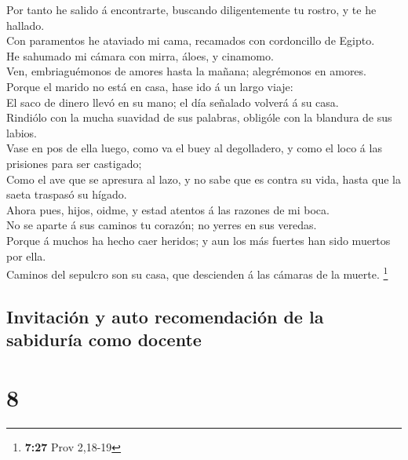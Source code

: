  Por tanto he salido á encontrarte, buscando diligentemente
tu rostro, y te he hallado.\\
 Con paramentos he ataviado mi cama, recamados con
cordoncillo de Egipto.\\
 He sahumado mi cámara con mirra, áloes, y cinamomo.\\
 Ven, embriaguémonos de amores hasta la mañana; alegrémonos
en amores.\\
 Porque el marido no está en casa, hase ido á un largo
viaje:\\
 El saco de dinero llevó en su mano; el día señalado
volverá á su casa.\\
 Rindiólo con la mucha suavidad de sus palabras, obligóle
con la blandura de sus labios.\\
 Vase en pos de ella luego, como va el buey al degolladero,
y como el loco á las prisiones para ser castigado;\\
 Como el ave que se apresura al lazo, y no sabe que es
contra su vida, hasta que la saeta traspasó su hígado.\\
 Ahora pues, hijos, oidme, y estad atentos á las razones de
mi boca.\\
 No se aparte á sus caminos tu corazón; no yerres en sus
veredas.\\
 Porque á muchos ha hecho caer heridos; y aun los más
fuertes han sido muertos por ella.\\
 Caminos del sepulcro son su casa, que descienden á las
cámaras de la muerte. \footnote{\textbf{7:27} Prov 2,18-19}

\hypertarget{invitaciuxf3n-y-auto-recomendaciuxf3n-de-la-sabiduruxeda-como-docente}{%
\subsection{Invitación y auto recomendación de la sabiduría como
docente}\label{invitaciuxf3n-y-auto-recomendaciuxf3n-de-la-sabiduruxeda-como-docente}}

\hypertarget{section-7}{%
\section{8}\label{section-7}}

